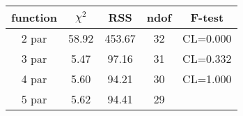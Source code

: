 \begin{tabular}{c|c|c|c|c}
function & $\chi^2$ & RSS & ndof & F-test \\
\hline
2 par & 58.92 & 453.67 & 32 & CL=0.000 \\
3 par & 5.47 & 97.16 & 31 & CL=0.332 \\
4 par & 5.60 & 94.21 & 30 & CL=1.000 \\
5 par & 5.62 & 94.41 & 29 & \\
\hline
\end{tabular}